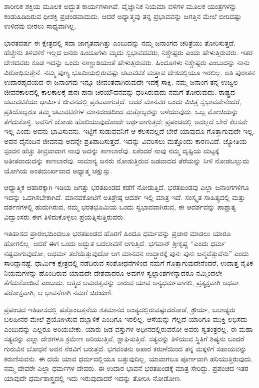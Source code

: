 ಶಾರೀರಿಕ ಶಕ್ತಿಯ ಮೂಲಕ ಅದ್ಭುತ ಕಾರ್ಯಗಳಾಗಿವೆ. ವೈಜ್ಞಾನಿಕ ನಿಯಮಾ ವಳಿಗಳ ಮೂಲಕ ಯಂತ್ರಗಳನ್ನು ಕಂಡುಹಿಡಿದಿರುವ ಧೀಶಕ್ತಿ ಪ್ರಚಂಡವಾದುದು. ಆದರೆ ಅಧ್ಯಾತ್ಮವು ತನ್ನ ಪ್ರಭಾವವನ್ನು ಜಗತ್ತಿನ ಮೇಲೆ ಬೀರಿದಷ್ಟು ಉಳಿದವು ಬೀರಲು ಸಾಧ್ಯವಾಗಿಲ್ಲ.

ಭಾರತವರ್ಷ ಈ ಕ್ಷೇತ್ರದಲ್ಲಿ ಸದಾ ಜಾಗೃತವಾಗಿತ್ತು ಎಂಬುದನ್ನು ನಮ್ಮ ಜನಾಂಗದ ಚರಿತ್ರೆಯು ತೋರಿಸುತ್ತದೆ. ಹೆಚ್ಚೇನು ತಿಳಿವಳಿಕೆ ಇಲ್ಲದ ಜನರು ಹಿಂದೂಗಳು ಮೃದು ಸ್ವಭಾವದವರು, ನಿಶ್ಚೇಷ್ಟರು ಎಂದು ಹೇಳುತ್ತಿರುವರು. ಇತರ ದೇಶದವರು ಕೂಡ ಇದನ್ನು ಒಂದು ನಾಣ್ಣುಡಿಯಂತೆ ಹೇಳುತ್ತಿರುವರು. ಹಿಂದೂಗಳು ನಿಶ್ಚೇಷ್ಟರು ಎಂಬುದನ್ನು ನಾನು ವಿರೋಧಿಸುತ್ತೇನೆ. ನಮ್ಮ ಪುಣ್ಯ ಭೂಮಿಯಲ್ಲಿರುವಷ್ಟು ಚಟುವಟಿಕೆ ಮತ್ತಾವ ದೇಶದಲ್ಲಿಯೂ ಇರಲಿಲ್ಲ. ಅತಿ ಪುರಾತನ ಉದಾರಹೃದಯದ ಈ ಜನಾಂಗವು ಇನ್ನೂ ಜೀವಂತವಾಗಿರುವುದೇ ಇದಕ್ಕೆ ಸಾಕ್ಷಿ. ನಮ್ಮ ಜನಾಂಗ ತನ್ನ ಉಜ್ವಲ ಜೀವನಕಾಲದಲ್ಲಿ ಕಾಲಕಾಲಕ್ಕೆ ಪುನಃ ಪುನಃ ಚಿರಯೌವನವನ್ನು ಧರಿಸಿರುವುದು ನಮಗೆ ತೋರುವುದು. ರಾಷ್ಟ್ರದ ಚಟುವಟಿಕೆಯು ಧಾರ್ಮಿಕ ಜೀವನದಲ್ಲಿ ಪ್ರಕಟವಾಗುತ್ತದೆ. ಆದರೆ ಮಾನವರ ಒಂದು ವಿಚಿತ್ರ ಸ್ವಭಾವವೇನೆಂದರೆ, ಪ್ರತಿಯೊಬ್ಬರೂ ತಮ್ಮ ಚಟುವಟಿಕೆಗಳ ಮಾನದಂಡದಿಂದ ಮತ್ತೊಬ್ಬರನ್ನು ಅಳೆಯುವುದು. ಒಬ್ಬ ಮೋಚಿಯನ್ನು ತೆಗೆದುಕೊಳ್ಳಿ. ಅವನಿಗೆ ಜೋಡು ಹೊಲಿಯುವುದೊಂದೇ ಅರ್ಥವಾಗುತ್ತದೆ; ಪ್ರಪಂಚದಲ್ಲಿ ಅದಲ್ಲದೆ ಬೇರೆ ಕೆಲಸವೇ ಇಲ್ಲ ಎಂದು ಅವನು ಭಾವಿಸುವನು. ಇಟ್ಟಿಗೆ ಸುಡುವವನಿಗೆ ಆ ಕೆಲಸವಲ್ಲದೆ ಬೇರೆ ಯಾವುದೂ ಗೊತ್ತಾಗುವುದೇ ಇಲ್ಲ. ಅವನ ದೈನಂದಿನ ಜೀವನವು ಅದನ್ನೇ ಪ್ರತಿಪಾದಿಸುತ್ತದೆ. ಇದನ್ನು ವಿವರಿಸಲು ಮತ್ತೊಂದು ಕಾರಣವಿದೆ. ಜ್ಯೋತಿಯ ಸ್ಪಂದನ ಹೆಚ್ಚು ತೀವ್ರವಾದಾಗ ನಾವು ಅದನ್ನು ಕಾಣಲಾರೆವು. ಏಕೆಂದರೆ ನಾವು ನಮ್ಮ ದೃಷ್ಟಿಯ ಮಟ್ಟಕ್ಕೆ ಅತೀತವಾದುದನ್ನು ಕಾಣಲಾರೆವು. ಸಾಮಾನ್ಯ ಜನರು ನೋಡುತ್ತಿರುವ ಜಡವಾದದ ತೆರೆಯನ್ನು ಸೀಳಿ ನೋಡಬಲ್ಲುದು ಯೋಗಿಯ ಅಂತಮುರ್ಖವಾದ ಅಧ್ಯಾತ್ಮ ಚಕ್ಷುಸ್ಸು.

\vskip 2pt

ಆಧ್ಯಾತ್ಮಿಕ ಆಹಾರಕ್ಕಾಗಿ ಇಡಿಯ ಜಗತ್ತು ಭರತಖಂಡದ ಕಡೆಗೆ ನೋಡುತ್ತಿದೆ. ಭರತಖಂಡವು ಎಲ್ಲಾ ಜನಾಂಗಗಳಿಗೂ ಇದನ್ನು ಒದಗಿಸಬೇಕಾಗಿದೆ. ಮಾನವಕೋಟಿಗೆ ಅತಿಶ್ರೇಷ್ಠ ಆದರ್ಶ ಇಲ್ಲಿ ಮಾತ್ರ ಇದೆ. ಸಂಸ್ಕೃತ ಸಾಹಿತ್ಯದಲ್ಲಿ ಮತ್ತು ದರ್ಶನಗಳಲ್ಲಿ ಹುದುಗಿರುವ, ನಮ್ಮ ಭರತಭೂಮಿಯ ಒಂದು ಸ್ವಭಾವವಾಗಿರುವ, ಈ ಆದರ್ಶವನ್ನು ಪಾಶ್ಚಾತ್ಯ ವಿದ್ವಾಂಸರು ಈಗ ತಿಳಿದುಕೊಳ್ಳಲು ಪ್ರಯತ್ನಿಸುತ್ತಿರುವರು.

ಇತಿಹಾಸದ ಪ್ರಾರಂಭದಿಂದಲೂ ಭರತಖಂಡದ ಹೊರಗೆ ಹಿಂದೂ ಧರ್ಮವನ್ನು ಪ್ರಚಾರ ಮಾಡಲು ಯಾರೂ ಹೋಗಲಿಲ್ಲ. ಆದರೆ ಈಗ ಒಂದು ಅದ್ಭುತ ಬದಲಾವಣೆ ಆಗುತ್ತಿದೆ. ಭಗವಾನ್​ ಶ‍್ರೀಕೃಷ್ಣ “ಎಂದು ಧರ್ಮ ನಷ್ಟವಾಗುವುದೋ, ಅಧರ್ಮ ತಲೆಯೆತ್ತುವುದೋ ಆಗ ಮಾನವನ ಉದ್ಧಾರಕ್ಕೆ ಪುನಃ ಪುನಃ ಜನ್ಮವೆತ್ತುವೆನು” ಎಂದು ಸಾರಿದ್ದಾನಷ್ಟೆ. ಧಾರ್ಮಿಕ ಕ್ಷೇತ್ರದಲ್ಲಿ ನಡೆದಿರುವ ಸಂಶೋಧನೆಗಳಿಂದ ನಮಗೆ ಗೊತ್ತಾಗುವುದೇನೆಂದರೆ, ಉದಾತ್ತ ನೈತಿಕ ನಿಯಮಗಳನ್ನು ಹೊಂದಿರುವ ಯಾವುದೇ ದೇಶವಾದರೂ ಅವುಗಳ ಸ್ವಲ್ಪಾಂಶಗಳನ್ನಾದರೂ ನಮ್ಮಿಂದಲೇ ತೆಗೆದುಕೊಂಡಿವೆ ಎಂಬುದು. ಆತ್ಮದ ಅಮರತ್ವವನ್ನು ಸಾರುವ ಯಾವ ಅನ್ಯಧರ್ಮವಾಗಲಿ, ಪ್ರತ್ಯಕ್ಷವಾಗಿ ಅಥವಾ ಪರೋಕ್ಷವಾಗಿ, ಆ ಭಾವನೆಗಾಗಿ ನಮಗೆ ಚಿರಋಣಿ.

ಪ್ರಪಂಚದ ಇತಿಹಾಸದಲ್ಲಿ ಹತ್ತೊಂಬತ್ತನೆಯ ಶತಮಾನದ ಅಂತ್ಯದಲ್ಲಿರುವಷ್ಟು\break ದರೋಡೆ, ಕ್ರೌರ್ಯ, ಬಲಾಢ್ಯರು ಬಲಹೀನರ ಮೇಲೆ ಪ್ರಯೋಗಿಸುವ ದಬ್ಬಾಳಿಕೆ ಎಂದಿಗೂ ಇರಲಿಲ್ಲ. ಆಸೆಯನ್ನು ಗೆಲ್ಲದೆ ಯಾರಿಗೂ ಮುಕ್ತಿ ಲಭಿಸದು ಎಂಬುದನ್ನು ಎಲ್ಲರೂ ಅರಿಯಬೇಕು. ಯಾರು ಜಡ ವಸ್ತುಗಳ ಅಧೀನದಲ್ಲಿರುವರೋ ಅವರು ಸ್ವತಂತ್ರರಲ್ಲ. ಈ ಮಹಾ ಸತ್ಯವನ್ನು ಎಲ್ಲಾ ದೇಶಗಳೂ ಕ್ರಮೇಣ ಅರಿಯುತ್ತಿವೆ, ಶ್ಲಾಘಿಸುತ್ತಿವೆ. ಸತ್ಯವನ್ನು ತಿಳಿಯುವ ಸ್ಥಿತಿಗೆ ಶಿಷ್ಯನು ಬಂದರೆ ಗುರುವಿನ ಬೋಧನೆ ಅವನ ನೆರವಿಗೆ ಬರುತ್ತದೆ. ಭಗವಂತನು ಅಪಾರ ಕರುಣೆಯಿಂದ ತನ್ನ ಮಕ್ಕಳಿಗೆ ಸಹಾಯವನ್ನು ಕರುಣಿಸುವನು. ಈ ದಯೆ ಯಾವ ಧರ್ಮದಲ್ಲಿಯೂ ಬತ್ತುವುದಿಲ್ಲ. ಯಾವಾಗಲೂ ಪೂರ್ಣವಾಗಿ ಹರಿಯುತ್ತಿರುವುದು. ನಮ್ಮ ದೇವರೇ ಎಲ್ಲಾ ಧರ್ಮಗಳ ದೇವರು. ಈ ಉದಾರ ಭಾವನೆ ಭರತಖಂಡಕ್ಕೆ ಮಾತ್ರ ಸೇರಿದ್ದು. ಪ್ರಪಂಚದ ಇತರ ಯಾವುದೇ ಧರ್ಮಶಾಸ್ತ್ರದಲ್ಲಿ ಇದು ಇರುವುದಾದರೆ ಇದನ್ನು ತೋರಿಸಿ ನೋಡೋಣ.

